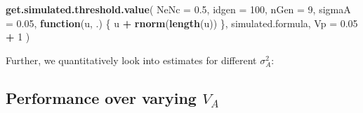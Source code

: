 \documentclass[
]{article}
\newenvironment{Shaded}{\begin{snugshade}}{\end{snugshade}}
\newcommand{\AttributeTok}[1]{\textcolor[rgb]{0.13,0.29,0.53}{#1}}
\newcommand{\ControlFlowTok}[1]{\textcolor[rgb]{0.13,0.29,0.53}{\textbf{#1}}}
\newcommand{\DecValTok}[1]{\textcolor[rgb]{0.00,0.00,0.81}{#1}}
\newcommand{\FloatTok}[1]{\textcolor[rgb]{0.00,0.00,0.81}{#1}}
\newcommand{\FunctionTok}[1]{\textcolor[rgb]{0.13,0.29,0.53}{\textbf{#1}}}
\newcommand{\NormalTok}[1]{#1}
\newcommand{\SpecialCharTok}[1]{\textcolor[rgb]{0.81,0.36,0.00}{\textbf{#1}}}
\begin{document}
\begin{Shaded}
\begin{Highlighting}[]
\FunctionTok{get.simulated.threshold.value}\NormalTok{(}
  \AttributeTok{NeNc =} \FloatTok{0.5}\NormalTok{, }\AttributeTok{idgen =} \DecValTok{100}\NormalTok{, }\AttributeTok{nGen =} \DecValTok{9}\NormalTok{, }\AttributeTok{sigmaA =} \FloatTok{0.05}\NormalTok{,}
  \ControlFlowTok{function}\NormalTok{(u, .) \{}
\NormalTok{    u }\SpecialCharTok{+} \FunctionTok{rnorm}\NormalTok{(}\FunctionTok{length}\NormalTok{(u))}
\NormalTok{  \},}
\NormalTok{  simulated.formula,}
  \AttributeTok{Vp =} \FloatTok{0.05} \SpecialCharTok{+} \DecValTok{1}
\NormalTok{)}
\end{Highlighting}
\end{Shaded}

Further, we quantitatively look into estimates for different
\(\sigma^2_A\):

\hypertarget{performance-over-varying-v_a}{%
\subsection*{\texorpdfstring{Performance over varying
\(V_A\)}{Performance over varying V\_A}}\label{performance-over-varying-v_a}}
\end{document}
